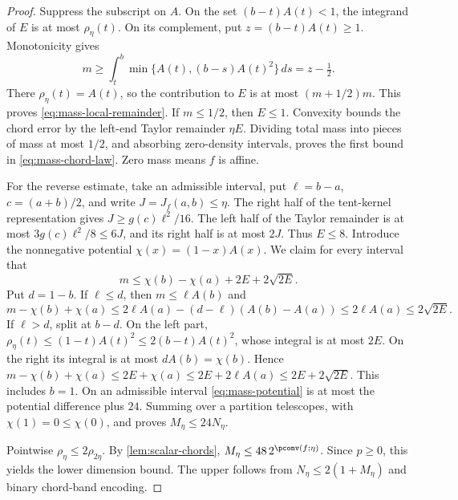 \begin{proof}
Suppress the subscript on $A$. On the set $(b-t)A(t)<1$, the
integrand of $E$ is at most $\rho_\eta(t)$. On its complement, put
$z=(b-t)A(t)\ge1$. Monotonicity gives
\[
 m\ge\int_t^b\min\{A(t),(b-s)A(t)^2\}\,ds=z-\tfrac12.
\]
There $\rho_\eta(t)=A(t)$, so the contribution to $E$ is at most
$(m+1/2)m$. This proves \eqref{eq:mass-local-remainder}. If $m\le1/2$,
then $E\le1$. Convexity bounds the chord error by the left-end Taylor
remainder $\eta E$. Dividing total mass into pieces of mass at most
$1/2$, and absorbing zero-density intervals, proves the first bound
in \eqref{eq:mass-chord-law}. Zero mass means $f$ is affine.

For the reverse estimate, take an admissible interval, put
$\ell=b-a$, $c=(a+b)/2$, and write $J=J_f(a,b)\le\eta$.
The right half of the tent-kernel representation gives
$J\ge g(c)\ell^2/16$. The left half of the Taylor remainder is at
most $3g(c)\ell^2/8\le6J$, and its right half is at most $2J$.
Thus $E\le8$. Introduce the nonnegative potential
$\chi(x)=(1-x)A(x)$. We claim for every interval that
\begin{equation}\label{eq:mass-potential}
 m\le\chi(b)-\chi(a)+2E+2\sqrt{2E}.
\end{equation}
Put $d=1-b$. If $\ell\le d$, then $m\le\ell A(b)$ and
\[
 m-\chi(b)+\chi(a)
 \le2\ell A(a)-(d-\ell)(A(b)-A(a))
 \le2\ell A(a)\le2\sqrt{2E}.
\]
If $\ell>d$, split at $b-d$. On the left part,
$\rho_\eta(t)\le(1-t)A(t)^2\le2(b-t)A(t)^2$, whose integral is at
most $2E$. On the right its integral is at most $dA(b)=\chi(b)$.
Hence $m-\chi(b)+\chi(a)\le2E+\chi(a)
\le2E+2\ell A(a)\le2E+2\sqrt{2E}$. This includes $b=1$.
On an admissible interval \eqref{eq:mass-potential} is at most the
potential difference plus $24$. Summing over a partition telescopes,
with $\chi(1)=0\le\chi(0)$, and proves $M_\eta\le24N_\eta$.

Pointwise $\rho_\eta\le2\rho_{2\eta}$. By
\cref{lem:scalar-chords}, $M_\eta\le48\,2^{\pconv(f;\eta)}$.
Since $p\ge0$, this yields the lower dimension bound. The upper follows
from $N_\eta\le2(1+M_\eta)$ and binary chord-band encoding.
\end{proof}

